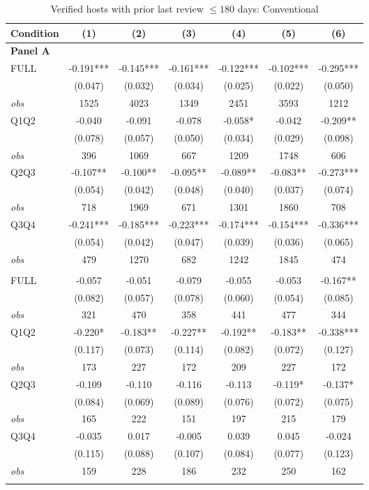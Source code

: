 \begin{table}[!htbp]
\centering
\caption{Verified hosts with prior last review $\leq180$ days: Conventional}
\begin{tabular}{lcccccc}
\toprule
Condition & (1) & (2) & (3) & (4) & (5) & (6) \\
\midrule
\multicolumn{7}{l}{\textbf{Panel A}} \\

FULL & -0.191*** & -0.145*** & -0.161*** & -0.122*** & -0.102*** & -0.295*** \\
 & (0.047) & (0.032) & (0.034) & (0.025) & (0.022) & (0.050) \\
\textit{obs} & 1525 & 4023 & 1349 & 2451 & 3593 & 1212 \\
Q1Q2 & -0.040 & -0.091 & -0.078 & -0.058* & -0.042 & -0.209** \\
 & (0.078) & (0.057) & (0.050) & (0.034) & (0.029) & (0.098) \\
\textit{obs} & 396 & 1069 & 667 & 1209 & 1748 & 606 \\
Q2Q3 & -0.107** & -0.100** & -0.095** & -0.089** & -0.083** & -0.273*** \\
 & (0.054) & (0.042) & (0.048) & (0.040) & (0.037) & (0.074) \\
\textit{obs} & 718 & 1969 & 671 & 1301 & 1860 & 708 \\
Q3Q4 & -0.241*** & -0.185*** & -0.223*** & -0.174*** & -0.154*** & -0.336*** \\
 & (0.054) & (0.042) & (0.047) & (0.039) & (0.036) & (0.065) \\
\textit{obs} & 479 & 1270 & 682 & 1242 & 1845 & 474 \\
\addlinespace
\multicolumn{7}{l}{\textbf{Panel B}} \\

FULL & -0.057 & -0.051 & -0.079 & -0.055 & -0.053 & -0.167** \\
 & (0.082) & (0.057) & (0.078) & (0.060) & (0.054) & (0.085) \\
\textit{obs} & 321 & 470 & 358 & 441 & 477 & 344 \\
Q1Q2 & -0.220* & -0.183** & -0.227** & -0.192** & -0.183** & -0.338*** \\
 & (0.117) & (0.073) & (0.114) & (0.082) & (0.072) & (0.127) \\
\textit{obs} & 173 & 227 & 172 & 209 & 227 & 172 \\
Q2Q3 & -0.109 & -0.110 & -0.116 & -0.113 & -0.119* & -0.137* \\
 & (0.084) & (0.069) & (0.089) & (0.076) & (0.072) & (0.075) \\
\textit{obs} & 165 & 222 & 151 & 197 & 215 & 179 \\
Q3Q4 & -0.035 & 0.017 & -0.005 & 0.039 & 0.045 & -0.024 \\
 & (0.115) & (0.088) & (0.107) & (0.084) & (0.077) & (0.123) \\
\textit{obs} & 159 & 228 & 186 & 232 & 250 & 162 \\
\addlinespace
\multicolumn{7}{l}{\textbf{Panel C}} \\


\end{tabular}
\end{table}
